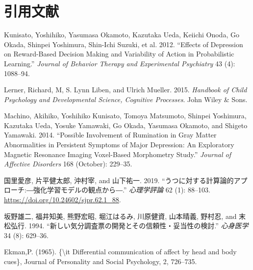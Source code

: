 \documentclass[11pt,a4paper,xelatex,ja=standard]{bxjsarticle}
\begin{document}
\hypertarget{ux5f15ux7528ux6587ux732e}{%
\section{引用文献}\label{ux5f15ux7528ux6587ux732e}}

\hypertarget{refs}{}
\leavevmode\hypertarget{ref-Kunisato2012}{}%
Kunisato, Yoshihiko, Yasumasa Okamoto, Kazutaka Ueda, Keiichi Onoda, Go
Okada, Shinpei Yoshimura, Shin-Ichi Suzuki, et al. 2012. ``Effects of
Depression on Reward-Based Decision Making and Variability of Action in
Probabilistic Learning.'' \emph{Journal of Behavior Therapy and
Experimental Psychiatry} 43 (4): 1088--94.

\leavevmode\hypertarget{ref-lerner2015handbook}{}%
Lerner, Richard, M, S. Lynn Liben, and Ulrich Mueller. 2015.
\emph{Handbook of Child Psychology and Developmental Science, Cognitive
Processes}. John Wiley \& Sons.

\leavevmode\hypertarget{ref-Machino2014}{}%
Machino, Akihiko, Yoshihiko Kunisato, Tomoya Matsumoto, Shinpei
Yoshimura, Kazutaka Ueda, Yosuke Yamawaki, Go Okada, Yasumasa Okamoto,
and Shigeto Yamawaki. 2014. ``Possible Involvement of Rumination in Gray
Matter Abnormalities in Persistent Symptoms of Major Depression: An
Exploratory Magnetic Resonance Imaging Voxel-Based Morphometry Study.''
\emph{Journal of Affective Disorders} 168 (October): 229--35.

\leavevmode\hypertarget{ref-kunisato2019}{}%
国里愛彦, 片平健太郎, 沖村宰, and 山下祐一. 2019.
``うつに対する計算論的アプローチ:―強化学習モデルの観点から―.''
\emph{心理学評論} 62 (1): 88--103.
\url{https://doi.org/10.24602/sjpr.62.1_88}.

\leavevmode\hypertarget{ref-ux5742ux91ceux96c4ux4e8c1994}{}%
坂野雄二, 福井知美, 熊野宏昭, 堀江はるみ, 川原健資, 山本晴義, 野村忍,
and 末松弘行. 1994.
``新しい気分調査票の開発とその信頼性・妥当性の検討.'' \emph{心身医学} 34
(8): 629--36.

Ekman,P. (1965). \{\textbackslash it Differential communication of
affect by head and body cues\}, Journal of Personality and Social
Psychology, 2, 726--735.
\end{document}
